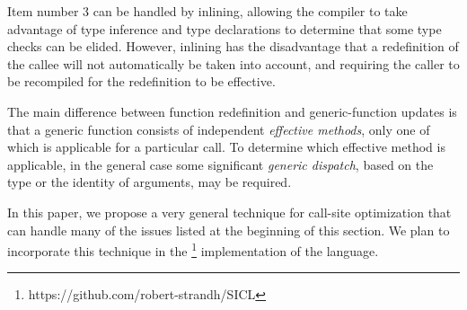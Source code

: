 Item number 3 can be handled by inlining, allowing the compiler to
take advantage of type inference and type declarations to determine
that some type checks can be elided.  However, inlining has the
disadvantage that a redefinition of the callee will not automatically
be taken into account, and requiring the caller to be recompiled for
the redefinition to be effective.

The main difference between function redefinition and generic-function
updates is that a generic function consists of independent
\emph{effective methods}, only one of which is applicable for a
particular call.  To determine which effective method is applicable,
in the general case some significant \emph{generic dispatch}, based on
the type or the identity of arguments, may be required.

In this paper, we propose a very general technique for call-site
optimization that can handle many of the issues listed at the
beginning of this section.  We plan to incorporate this technique in
the \sicl{}%
\footnote{https://github.com/robert-strandh/SICL}
implementation of the \commonlisp{} language.

